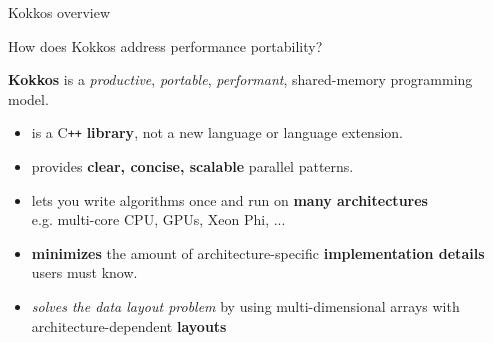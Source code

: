 \begin{frame}[fragile]{Kokkos overview}

  How does Kokkos address performance portability?

  \vspace{10pt}

  \textbf{Kokkos} is a \emph{productive}, \emph{portable}, \emph{performant}, shared-memory programming model.

  \begin{itemize}
    \item{is a C\texttt{++} \textbf{library}, not a new language or language extension.}
    \item{provides \textbf{clear, concise, scalable} parallel patterns.}
    \item{lets you write algorithms once and run on \textbf{many architectures} \\
          \hspace{20pt}e.g. multi-core CPU, GPUs, Xeon Phi, ...}
    \item{\textbf{minimizes} the amount of architecture-specific \textbf{implementation details} users must know.}
    \item{\emph{solves the data layout problem} by using multi-dimensional arrays with architecture-dependent \textbf{layouts}} \\
  \end{itemize}

\end{frame}


